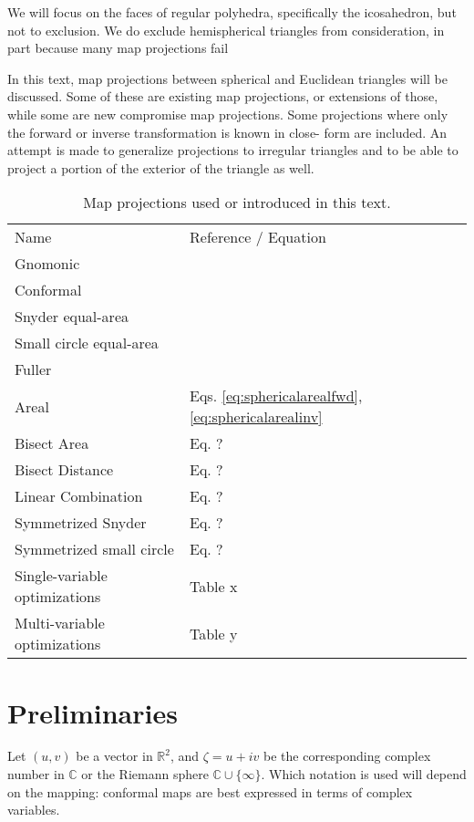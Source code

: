 \documentclass{amsart}[12pt]
\begin{document}
We will focus on the faces of regular polyhedra, specifically the icosahedron, but not to exclusion. We do exclude hemispherical triangles from consideration, in part because many map projections fail 


In this text, map projections between spherical and Euclidean
triangles will be discussed. Some of these are existing map projections, or
extensions of those, while some are new compromise map projections. Some
projections where only the forward or inverse transformation is known in close-
form are included. An attempt is made to generalize projections to irregular
triangles and to be able to project a portion of the exterior of the triangle
as well.

\begin{table}
\begin{tabular}[]{l l}
  Name & Reference / Equation \\
  Gnomonic & \cite{snyder87}  \\
  Conformal & \cite{lee1976conformal} \\
  Snyder equal-area & \cite{snyder92} \\
  Small circle equal-area & \cite{leeuwen2006} \\
  Fuller & \cite{crider08} \\
  Areal & Eqs. \ref{eq:sphericalarealfwd}, \ref{eq:sphericalarealinv} \\
  Bisect Area & Eq. ? \\
  Bisect Distance & Eq. ? \\  
  Linear Combination & Eq. ?\\  
  Symmetrized Snyder & Eq. ? \\
  Symmetrized small circle & Eq. ? \\
  Single-variable optimizations & Table x \\
  Multi-variable optimizations & Table y  
\end{tabular}
\caption{Map projections used or introduced in this text.}
\label{fig:projs}
\end{table}

\section{Preliminaries}
Let $(u,v)$ be a vector in $\mathbb R^2$, and $\zeta = u + i v$ be the
corresponding complex number in $\mathbb C$ or the Riemann sphere $\mathbb C
\cup \{\infty\}$. Which notation is used will depend on the mapping:
conformal maps are best expressed in terms of complex variables.
\end{document}

